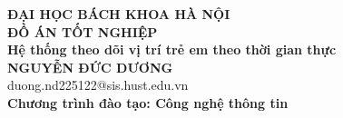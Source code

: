 \documentclass[DoAn.tex]{subfiles}
\begin{document}
\begin{titlepage}
\thispagestyle{empty}
\begin{center}

{\textbf{\large{ĐẠI HỌC BÁCH KHOA HÀ NỘI}}}\\[4cm]

{\textbf{\huge{ ĐỒ ÁN TỐT NGHIỆP}}}\\[1cm]
{\textbf{\Large{Hệ thống theo dõi vị trí trẻ em theo thời gian thực}}}\\[1cm]

{\textbf{\large{NGUYỄN ĐỨC DƯƠNG}}}\\
{\large{duong.nd225122@sis.hust.edu.vn}}\\[0.5cm]

{\textbf{\large{Chương trình đào tạo: Công nghệ thông tin
}}}\\

\vspace{4cm}
\begin{table}[H]
\centering
{}
\end{table}
\end{center}



\end{titlepage}
\end{document}
